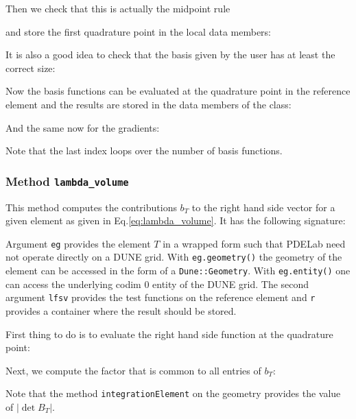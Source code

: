 \documentclass[a4paper,12pt]{article}
\begin{document}
Then we check that this is actually the midpoint rule

and store the first quadrature point in the local data members:

It is also a good idea to check that the basis given by the user
has at least the correct size:

Now the basis functions can be evaluated at the quadrature
point in the reference element and the results are stored in the 
data members of the class:

And the same now for the gradients:

Note that the last index loops over the number of basis
functions. 

\subsubsection*{Method \lstinline{lambda_volume}}

This method computes the contributions $b_T$ to the right hand side 
vector for a given element as given in Eq.\eqref{eq:lambda_volume}.
It has the following signature:

Argument \lstinline{eg} provides the element $T$ in
a wrapped form such that PDELab need not operate directly on a DUNE grid.
With \lstinline{eg.geometry()} the geometry of the element can be accessed
in the form of a \lstinline{Dune::Geometry}. With \lstinline{eg.entity()} one can
access the underlying codim 0 entity of the DUNE grid.
The second argument \lstinline{lfsv} provides the test functions on the reference
element and \lstinline{r} provides a container where the result should be stored.

First thing to do is to evaluate the right hand side function at the quadrature
point:


Next, we compute the factor that is common to all entries of $b_T$:

Note that the method \lstinline{integrationElement} on the geometry
provides the value of $|\det B_T|$.
\end{document}
